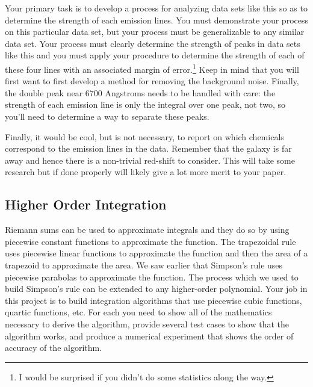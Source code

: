 Your primary task is to develop a process
for analyzing data sets like this so as to determine the strength of each emission lines.
You must demonstrate your process on this particular data set, but your process must be
generalizable to any similar data set.
Your process must clearly 
determine the strength of peaks in data sets like this and you must apply your procedure
to determine the strength of each of these four lines with an associated margin of
error.\footnote{I would be surprised if you didn't do some statistics along the way.}
Keep in mind that you will first want to first develop a method for removing the
background noise. Finally, the double peak near $6700$ Angstroms needs to be handled with care:
the strength of each emission line is only the integral over one peak, not two, so you'll
need to determine a way to separate these peaks.

Finally, it would be cool, but is not necessary, to report on which chemicals
correspond to the emission lines in the data.  Remember that the galaxy is far away and
hence there is a non-trivial red-shift to consider.  This will take some research but if
done properly will likely give a lot more merit to your paper.

\subsection{Higher Order Integration}
Riemann sums can be used to approximate integrals and they do so by using piecewise
constant functions to approximate the function.  The trapezoidal rule uses piecewise
linear functions to approximate the function and then the area of a trapezoid to
approximate the area.  We saw earlier that Simpson's rule uses piecewise parabolas to
approximate the function.  The process which we used to build Simpson's rule can be
extended to any higher-order polynomial.  Your job in this project is to build integration
algorithms that use piecewise cubic functions, quartic functions, etc.  For each you need
to show all of the mathematics necessary to derive the algorithm, provide several test
cases to show that the algorithm works, and produce a numerical experiment that shows the
order of accuracy of the algorithm.  

